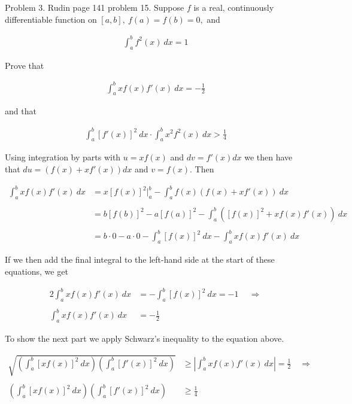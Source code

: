 \documentclass{article}
\begin{document}
  

  \pagebreak

  {\Large \color{Sepia} Problem 3. Rudin page 141 problem 15.  Suppose $f$ is a real, continuously differentiable function on $[a,b], \ f(a)=f(b)=0,$ and

  \begin{align*}
    \int_a^b f^2 (x) \ dx = 1
  \end{align*}

  Prove that

  \begin{align*}
    \int_a^b x f(x) f'(x) \ dx = -\frac 1 2
  \end{align*}

  and that

  \begin{align*}
    \int_a^b [f'(x)]^2\ dx \cdot \int_a^b x^2 f^2 (x) \ dx > \frac 1 4
  \end{align*}

  }

  \vspace{1cm}

  Using integration by parts with $u=xf(x)$ and $dv=f'(x)dx$ we then have that $du=(f(x)+xf'(x))dx$ and $v=f(x)$.  Then 

  \begin{align*}
    \int_a^b xf(x)f'(x) \ dx &= x[f(x)]^2\bigg|_a^b - \int_a^b f(x)(f(x)+xf'(x)) \ dx \\\\
    &= b[f(b)]^2-a[f(a)]^2 - \int_a^b ([f(x)]^2+xf(x)f'(x)) \ dx \\\\
    &= b\cdot 0 - a\cdot 0 - \int_a^b [f(x)]^2 \ dx - \int_a^b xf(x)f'(x) \ dx
  \end{align*}

  If we then add the final integral to the left-hand side at the start of these equations, we get 

  \begin{align*}
    2\int_a^b xf(x)f'(x) \ dx &= -\int_a^b [f(x)]^2 \ dx = -1 \ \quad \Rightarrow \\\\
    \int_a^b xf(x)f'(x) \ dx &= -\frac 1 2
  \end{align*}

  \vspace{1cm}

  To show the next part we apply Schwarz's inequality to the equation above.  

  \begin{align*}
    \sqrt{\left(\int_a^b [xf(x)]^2 \ dx \right)\left(\int_a^b [f'(x)]^2 \ dx\right)} &\geq \left|\int_a^b xf(x)f'(x) \ dx \right|=\frac 1 2 \quad \Rightarrow \\\\
    \left(\int_a^b [xf(x)]^2 \ dx \right)\left(\int_a^b [f'(x)]^2 \ dx\right) &\geq \frac 1 4
  \end{align*}
\end{document}
